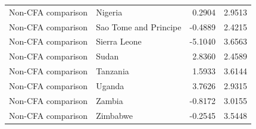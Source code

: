 \begin{table}
\begin{tabular}[t]{llrr}
Non-CFA comparison & Nigeria & 0.2904 & 2.9513\\
Non-CFA comparison & Sao Tome and Principe & -0.4889 & 2.4215\\
Non-CFA comparison & Sierra Leone & -5.1040 & 3.6563\\
\addlinespace
Non-CFA comparison & Sudan & 2.8360 & 2.4589\\
Non-CFA comparison & Tanzania & 1.5933 & 3.6144\\
Non-CFA comparison & Uganda & 3.7626 & 2.9315\\
Non-CFA comparison & Zambia & -0.8172 & 3.0155\\
Non-CFA comparison & Zimbabwe & -0.2545 & 3.5448\\
\bottomrule
\end{tabular}
\end{table}